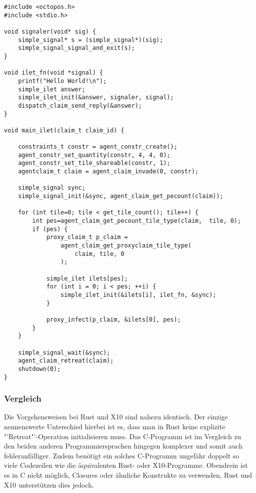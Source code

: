 \lstset{basicstyle=\small}
\begin{lstlisting}[float,caption={Minimales Invade, Infect, Retreat in C},label=code:c_minimal_infect]
#include <octopos.h>
#include <stdio.h>

void signaler(void* sig) {
    simple_signal* s = (simple_signal*)(sig);
    simple_signal_signal_and_exit(s);
}

void ilet_fn(void *signal) {
    printf("Hello World!\n");
    simple_ilet answer;
    simple_ilet_init(&answer, signaler, signal);
    dispatch_claim_send_reply(&answer);
}

void main_ilet(claim_t claim_id) {

    constraints_t constr = agent_constr_create();
    agent_constr_set_quantity(constr, 4, 4, 0);
    agent_constr_set_tile_shareable(constr, 1);
    agentclaim_t claim = agent_claim_invade(0, constr);

    simple_signal sync;
    simple_signal_init(&sync, agent_claim_get_pecount(claim));

    for (int tile=0; tile < get_tile_count(); tile++) {
        int pes=agent_claim_get_pecount_tile_type(claim,  tile, 0);
        if (pes) {
            proxy_claim_t p_claim =
                agent_claim_get_proxyclaim_tile_type(
                    claim, tile, 0
                );

            simple_ilet ilets[pes];
            for (int i = 0; i < pes; ++i) {
                simple_ilet_init(&ilets[i], ilet_fn, &sync);
            }

            proxy_infect(p_claim, &ilets[0], pes);
        }
    }

    simple_signal_wait(&sync);
    agent_claim_retreat(claim);
    shutdown(0);
}
\end{lstlisting}
\lstset{basicstyle=\normalsize}

\subsubsection{Vergleich}

Die Vorgehensweisen bei Rust und X10 sind nahezu identisch. Der einzige nennenswerte Unterschied hierbei ist es, dass
man in Rust keine explizite "'Retreat"'-Operation initialisieren muss.
Das C-Programm ist im Vergleich zu den beiden anderen Programmiersprachen hingegen komplexer und somit auch
fehleranfälliger. Zudem benötigt ein solches C-Programm ungefähr doppelt so viele
Codezeilen wie die äquivalenten Rust- oder X10-Programme. Obendrein ist es in C nicht möglich, Closures oder
ähnliche Konstrukte zu verwenden, Rust und X10 unterstützen dies jedoch.
